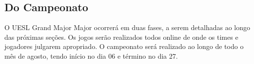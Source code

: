 \subsection{Do Campeonato}

O UESL Grand Major Major ocorrerá em duas fases, a serem detalhadas ao longo das próximas seções. Os jogos serão realizados todos online de onde os times e jogadores julgarem apropriado. O campeonato será realizado ao longo de todo o mês de agosto, tendo início no dia 06 e término no dia 27.
